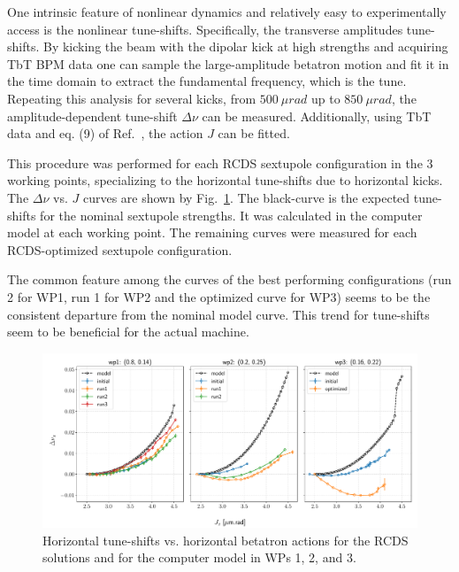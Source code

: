 One intrinsic feature of nonlinear dynamics and relatively easy to experimentally access is the nonlinear tune-shifts. Specifically, the transverse amplitudes tune-shifts. By kicking the beam with the dipolar kick at high strengths and acquiring TbT BPM data one can sample the large-amplitude betatron motion and fit it in the time domain to extract the fundamental frequency, which is the tune. Repeating this analysis for  several kicks, from $500~\unit{\mu rad}$ up to $850~\unit{\mu rad}$, the amplitude-dependent tune-shift $\Delta\nu$ can be measured. Additionally, using TbT data and eq. (9) of Ref.~\cite{resende_equillibrium}, the action $J$ can be fitted.

This procedure was performed for each RCDS sextupole configuration in the 3 working points, specializing to the horizontal tune-shifts due to horizontal kicks. The $\Delta \nu$ vs. $J$ curves are shown by Fig.~\ref{fig:adts}. The black-curve is the expected tune-shifts for the nominal sextupole strengths. It was calculated in the computer model at each working point. The remaining curves were measured for each RCDS-optimized sextupole configuration. 

The common feature among the curves of the best performing configurations (run 2 for WP1, run 1 for WP2 and the optimized curve for WP3) seems to be the consistent departure from the nominal model curve. This trend for tune-shifts seem to be beneficial for the actual machine.
\begin{figure}
    \includegraphics[width=\columnwidth]{Images/opt_configs_dtunes.pdf}
    \caption[Horizontal tune-shifts vs. horizontal betatron actions for the RCDS solutions and for the computer model in WPs 1, 2, and 3.]{Horizontal tune-shifts vs. horizontal betatron actions for the RCDS solutions and for the computer model in WPs 1, 2, and 3.}
    \label{fig:adts}
\end{figure}
